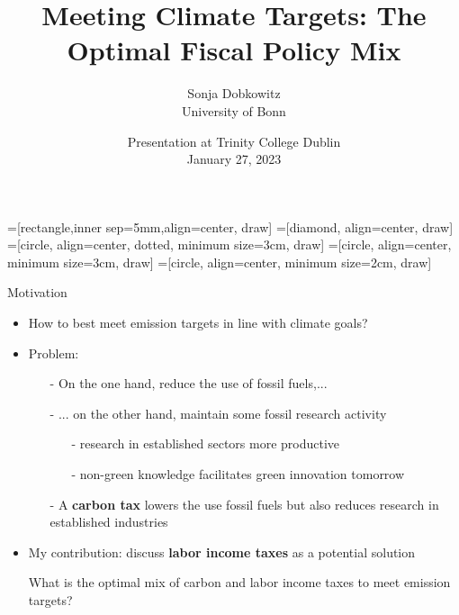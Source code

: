 \documentclass[11pt,aspectratio=169]{beamer}
\author[Sonja Dobkowitz]{\small Sonja Dobkowitz\\ \footnotesize{University of Bonn%
}\\ }
\title{Meeting Climate Targets: The Optimal Fiscal Policy Mix}
\date{\small{Presentation at Trinity College Dublin\\ January 27, 2023 }}
\begin{document}
=[rectangle,inner sep=5mm,align=center, draw]
=[diamond, align=center, draw]
=[circle, align=center, dotted, minimum size=3cm, draw]
=[circle, align=center, minimum size=3cm, draw]
=[circle, align=center, minimum size=2cm, draw]
{
	\begin{frame}
		\titlepage
	\end{frame}
}



\addtocounter{framenumber}{-1}
\begin{frame}{Motivation}
	\begin{itemize}[<+-| alert@+>]
		\item How to best meet emission targets in line with climate goals? %
		\vspace{3mm}
		\item Problem:
		\begin{itemize}
			\item[-] On the one hand,  reduce the use of fossil fuels,...
			\vspace{2mm}
			\item[-] ... on the other hand, %
			maintain some fossil research activity 
			\vspace{1mm}
			\begin{enumerate}
				\item[-] research in established sectors more productive
				\item[-] non-green knowledge facilitates green innovation tomorrow %
			\end{enumerate}%
			\vspace{2mm}				
			\item[-] A \textbf{carbon tax} lowers the use fossil fuels but also reduces research in established industries %
		\end{itemize} 
		\vspace{3mm}
		\item My contribution: discuss \textbf{labor income taxes} as a potential solution
		\vspace{3mm}
		\item[] \hspace{-4mm}\alert{{What is the optimal mix of carbon and labor income taxes to meet emission targets?}}
	\end{itemize}
\end{frame}
\end{document}
